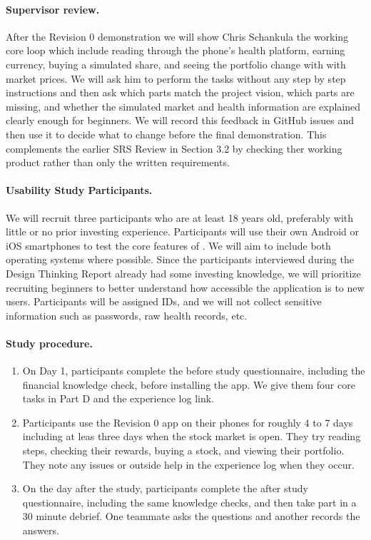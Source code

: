 \documentclass[12pt, titlepage]{article}
\begin{document}
\paragraph{Supervisor review.} After the Revision 0 demonstration we will show Chris Schankula the working core loop which include reading through the phone's health platform, earning currency, buying a simulated share, and seeing the portfolio change with with market prices. We will ask him to perform the tasks without any step by step instructions and then ask which parts match the project vision, which parts are missing, and whether the simulated market and health information are explained clearly enough for beginners. We will record this feedback in GitHub issues and then use it to decide what to change before the final demonstration. This complements the earlier SRS Review in Section 3.2 by checking ther working product rather than only the written requirements.

\paragraph{Usability Study Participants.} We will recruit three participants who are at least 18 years old, preferably with little or no prior investing experience. Participants will use their own Android or iOS smartphones to test the core features of \progname{}. We will aim to include both operating systems where possible. Since the participants interviewed during the Design Thinking Report already had some investing knowledge, we will prioritize recruiting beginners to better understand how accessible the application is to new users. Participants will be assigned IDs, and we will not collect sensitive information such as passwords, raw health records, etc.

\paragraph{Study procedure.}
\begin{enumerate}
  \item On Day 1, participants complete the before study questionnaire, including the financial knowledge check, before installing the app. We give them four core tasks in Part D and the experience log link.
  \item Participants use the Revision 0 app on their phones for roughly 4 to 7 days including at leas three days when the stock market is open. They try reading steps, checking their rewards, buying a stock, and viewing their portfolio. They note any issues or outside help in the experience log when they occur.
  \item On the day after the study, participants complete the after study questionnaire, including the same knowledge checks, and then take part in a 30 minute debrief. One teammate asks the questions and another records the answers.
\end{enumerate}
\end{document}

